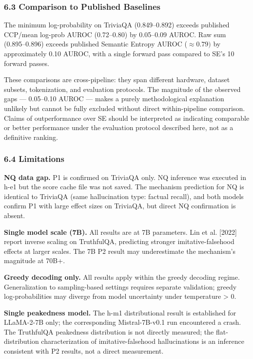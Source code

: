 \subsubsection{6.3 Comparison to Published Baselines}

The minimum log-probability on TriviaQA (0.849--0.892) exceeds published CCP/mean log-prob AUROC (0.72--0.80) \citep{Fadeeva2024Fact} by 0.05--0.09 AUROC. Raw sum (0.895--0.896) exceeds published Semantic Entropy AUROC ($\approx 0.79)$ \citep{Farquhar2024} by approximately 0.10 AUROC, with a single forward pass compared to SE's 10 forward passes.

These comparisons are cross-pipeline: they span different hardware, dataset subsets, tokenization, and evaluation protocols. The magnitude of the observed gaps --- 0.05--0.10 AUROC --- makes a purely methodological explanation unlikely but cannot be fully excluded without direct within-pipeline comparison. Claims of outperformance over SE should be interpreted as indicating comparable or better performance under the evaluation protocol described here, not as a definitive ranking.

\subsubsection{6.4 Limitations}

\textbf{NQ data gap.} P1 is confirmed on TriviaQA only. NQ inference was executed in h-e1 but the score cache file was not saved. The mechanism prediction for NQ is identical to TriviaQA (same hallucination type: factual recall), and both models confirm P1 with large effect sizes on TriviaQA, but direct NQ confirmation is absent.

\textbf{Single model scale (7B).} All results are at 7B parameters. Lin et al. [2022] report inverse scaling on TruthfulQA, predicting stronger imitative-falsehood effects at larger scales. The 7B P2 result may underestimate the mechanism's magnitude at 70B+.

\textbf{Greedy decoding only.} All results apply within the greedy decoding regime. Generalization to sampling-based settings requires separate validation; greedy log-probabilities may diverge from model uncertainty under temperature > 0.

\textbf{Single peakedness model.} The h-m1 distributional result is established for LLaMA-2-7B only; the corresponding Mistral-7B-v0.1 run encountered a crash. The TruthfulQA peakedness distribution is not directly measured; the flat-distribution characterization of imitative-falsehood hallucinations is an inference consistent with P2 results, not a direct measurement.

